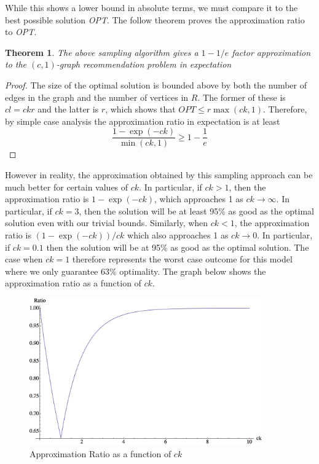 \documentclass[]{article}
\newtheorem{thm}{Theorem}
\begin{document}
While this shows a lower bound in absolute terms, we must compare it to the best possible solution {\em OPT}. The follow theorem proves the approximation ratio to {\em OPT}.

\begin{thm}
The above sampling algorithm gives a $1-1/e$ factor approximation to the $(c,1)$-graph recommendation problem in expectation
\end{thm}
\begin{proof}
The size of the optimal solution is bounded above by both the number
of edges in the graph and the number of vertices in $R$. The former of
these is $cl=ckr$ and the latter is $r$, which shows that $OPT \leq
r\max(ck,1)$. Therefore, by simple case analysis the approximation ratio in
expectation is at least
\[ \frac{1-\exp(-ck)}{\min(ck,1)} \geq 1-\frac{1}{e} \]
\end{proof}

However in reality, the approximation obtained by this sampling
approach can be much better for certain values of $ck$. In particular,
if $ck>1$, then the approximation ratio is $1-\exp(-ck)$, which
approaches 1 as $ck\to\infty$. In particular, if $ck=3$, then the
solution will be at least 95\% as good as the optimal solution even
with our trivial bounds. Similarly, when $ck<1$, the approximation
ratio is $(1-\exp(-ck))/ck$ which also approaches 1 as $ck\to 0$. In
particular, if $ck=0.1$ then the solution will be at 95\% as good as
the optimal solution. The case when $ck=1$ therefore represents the
worst case outcome for this model where we only guarantee 63\%
optimality. The graph below shows the approximation ratio as a
function of $ck$.

\begin{figure}[h]
\centering
\includegraphics[width=10cm]{Sri_Original.png}
\caption{Approximation Ratio as a function of $ck$ }
\end{figure}
\end{document}
